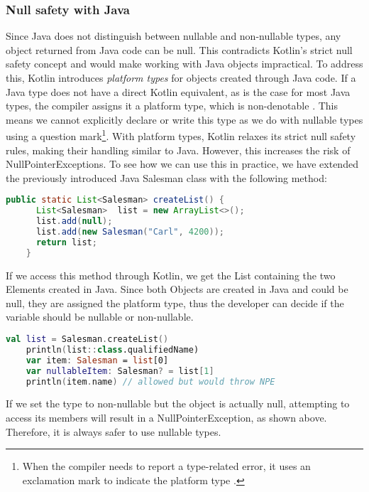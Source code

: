\documentclass[a4paper, 11pt]{article}
\begin{document}
\subsubsection{Null safety with Java}
  Since Java does not distinguish between nullable and non-nullable types, any object returned from Java code can be null. This contradicts Kotlin's strict null safety concept and would make working with Java objects impractical.
  To address this, Kotlin introduces \textit{platform types} for objects created through Java code. If a Java type does not have a direct Kotlin equivalent, as is the case for most Java types, the compiler assigns it a platform type, which is non-denotable \cite{interop-null-safety}. This means we cannot explicitly declare or write this type as we do with nullable types using a question mark\footnote{When the compiler needs to report a type-related error, it uses an exclamation mark to indicate the platform type \cite{interop-platform-notation}.}. With platform types, Kotlin relaxes its strict null safety rules, making their handling similar to Java. However, this increases the risk of NullPointerExceptions.
  To see how we can use this in practice, we have extended the previously introduced Java Salesman class with the following method:
  \begin{lstlisting}[language=Java]
    public static List<Salesman> createList() {
      List<Salesman>  list = new ArrayList<>();
      list.add(null);
      list.add(new Salesman("Carl", 4200));
      return list;
    }
  \end{lstlisting}
  If we access this method through Kotlin, we get the List containing the two Elements created in Java. Since both Objects are created in Java and could be null, they are assigned the platform type, thus the developer can decide if the variable should be nullable or non-nullable.
  \begin{lstlisting}[language=Kotlin]  
    val list = Salesman.createList()
    println(list::class.qualifiedName)
    var item: Salesman = list[0]
    var nullableItem: Salesman? = list[1]
    println(item.name) // allowed but would throw NPE
  \end{lstlisting}
  If we set the type to non-nullable but the object is actually null, attempting to access its members will result in a NullPointerException, as shown above. Therefore, it is always safer to use nullable types.
\end{document}
